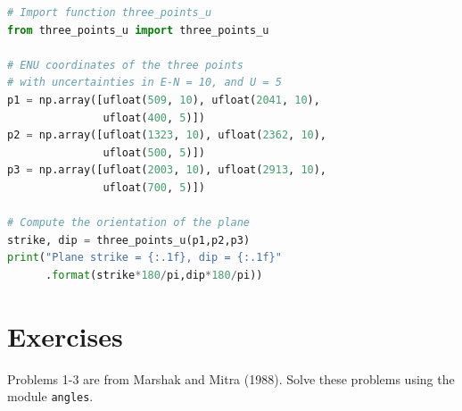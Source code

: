 \documentclass[a4paper , 12pt]{book}
\newcommand{\code}[1]{\colorbox{light-gray}{\texttt{#1}}}
\begin{document}
\begin{center}
\begin{lstlisting}[language=Python, frame=single]
# Import function three_points_u
from three_points_u import three_points_u

# ENU coordinates of the three points
# with uncertainties in E-N = 10, and U = 5
p1 = np.array([ufloat(509, 10), ufloat(2041, 10), 
               ufloat(400, 5)])
p2 = np.array([ufloat(1323, 10), ufloat(2362, 10), 
               ufloat(500, 5)])
p3 = np.array([ufloat(2003, 10), ufloat(2913, 10), 
               ufloat(700, 5)])

# Compute the orientation of the plane
strike, dip = three_points_u(p1,p2,p3)
print("Plane strike = {:.1f}, dip = {:.1f}"
      .format(strike*180/pi,dip*180/pi))
\end{lstlisting}
\end{center}

\section{Exercises} \label{exercises4}

Problems 1-3 are from Marshak and Mitra (1988). Solve these problems using the module \code{angles}.
\end{document}
